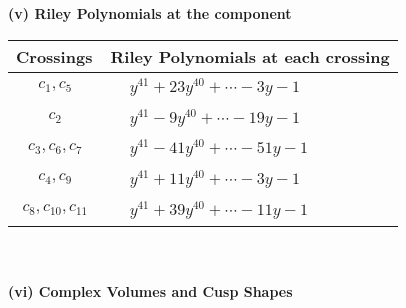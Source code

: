 \documentclass[1p]{elsarticle_modified}
\theoremstyle{definition}
\begin{document}
\newpage\renewcommand{\arraystretch}{1}
\flushleft \textbf{(v) Riley Polynomials at the component}\newline \\
\begin{tabular}{m{50pt}|m{274pt}}
Crossings & \hspace{64pt}Riley Polynomials at each crossing \\
\hline $$\begin{aligned}c_{1},c_{5}\end{aligned}$$&$\begin{aligned}
&y^{41}+23 y^{40}+\cdots-3 y-1
\end{aligned}$\\
\hline $$\begin{aligned}c_{2}\end{aligned}$$&$\begin{aligned}
&y^{41}-9 y^{40}+\cdots-19 y-1
\end{aligned}$\\
\hline $$\begin{aligned}c_{3},c_{6},c_{7}\end{aligned}$$&$\begin{aligned}
&y^{41}-41 y^{40}+\cdots-51 y-1
\end{aligned}$\\
\hline $$\begin{aligned}c_{4},c_{9}\end{aligned}$$&$\begin{aligned}
&y^{41}+11 y^{40}+\cdots-3 y-1
\end{aligned}$\\
\hline $$\begin{aligned}c_{8},c_{10},c_{11}\end{aligned}$$&$\begin{aligned}
&y^{41}+39 y^{40}+\cdots-11 y-1
\end{aligned}$\\
\hline
\end{tabular}\\~\\
\newpage\flushleft \textbf{(vi) Complex Volumes and Cusp Shapes}
\end{document}
